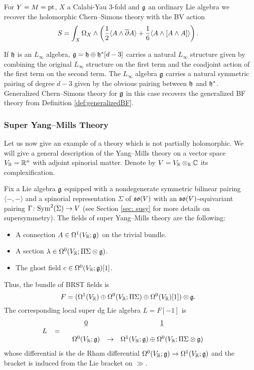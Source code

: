 \documentclass[10pt, oneside]{article}
\begin{document}
\begin{example}
For $Y=M=\operatorname{pt}$, $X$ a Calabi-Yau 3-fold and $\mathfrak g$ an ordinary Lie algebra we recover the holomorphic Chern--Simons theory with the BV action
\[S = \int_X \Omega_X\wedge \left(\frac{1}{2}\langle A\wedge \overline{\partial} A\rangle + \frac{1}{6}\langle A\wedge [A\wedge A]\rangle\right).\]
\end{example}

\begin{example}
If $\mathfrak h$ is an $L_\infty$ algebra, $\mathfrak g = \mathfrak h \oplus \mathfrak h^*[d-3]$ carries a natural $L_\infty$ structure given by combining the original $L_\infty$ structure on the first term and the coadjoint action of the first term on the second term. The $L_\infty$ algebra $\mathfrak g$ carries a natural symmetric pairing of degree $d-3$ given by the obvious pairing between $\mathfrak h$ and $\mathfrak h^*$. Generalized Chern--Simons theory for $\mathfrak g$ in this case recovers the generalized BF theory from Definition \ref{def:generalizedBF}.
\end{example}

\subsubsection{Super Yang--Mills Theory} \label{YM_section}

Let us now give an example of a theory which is not partially holomorphic. We will give a general description of the Yang--Mills theory on a vector space $V_\mathbb R = \mathbb R^n$ with adjoint spinorial matter. Denote by $V=V_\mathbb R\otimes_\mathbb R \mathbb C$ its complexification.

Fix a Lie algebra $\mathfrak g$ equipped with a nondegenerate symmetric bilinear pairing $\langle -, -\rangle$ and a spinorial representation $\Sigma$ of $\mathfrak{so}(V)$ with an $\mathfrak{so}(V)$-equivariant pairing $\Gamma \colon {\rm Sym}^2(\Sigma)\to V$ (see Section \ref{sec: susy} for more details on supersymmetry). The fields of super Yang--Mills theory are the following:
\begin{itemize}
\item A connection $A \in \Omega^1(V_\mathbb R; \mathfrak g)$ on the trivial bundle.

\item A section $\lambda \in \Omega^0(V_\mathbb R; \Pi \Sigma \otimes \mathfrak g)$.

\item The ghost field $c\in\Omega^0(V_\mathbb R; \mathfrak g)[1]$.
\end{itemize}

Thus, the bundle of BRST fields is
\[F = (\Omega^1(V_\mathbb R)\oplus \Omega^0(V_\mathbb R; \Pi\Sigma)\oplus \Omega^0(V_\mathbb R)[1])\otimes \mathfrak g.\]
The corresponding local super dg Lie algebra $L=F[-1]$ is
\[
L \;\;\; = \begin{array}{ccccc}
& \underline{0} & & \underline{1} & \\ 
& & & & \\
& \Omega^0(V_\mathbb R; \mathfrak{g}) & \to & \Omega^1(V_\mathbb R; \mathfrak{g}) \oplus \Omega^0(V_\mathbb R; \Pi \Sigma \otimes \mathfrak{g}) & 
\end{array}
\]
whose differential is the de Rham differential $\Omega^0(V_\mathbb R; \mathfrak{g})\rightarrow \Omega^1(V_\mathbb R; \mathfrak{g})$ and the bracket is induced from the Lie bracket on $\gg$.
\end{document}
